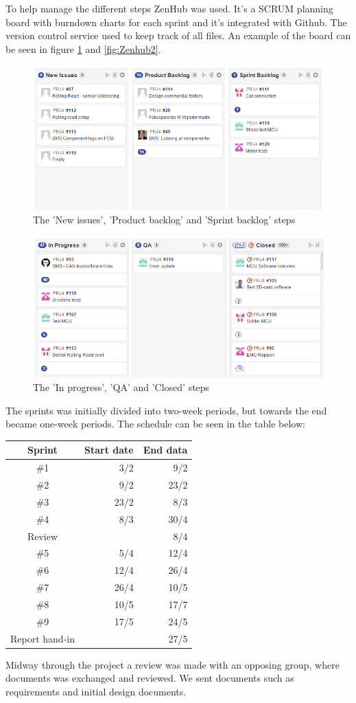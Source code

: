 To help manage the different steps ZenHub\cite{Zenhub} was used. It's a SCRUM planning board with burndown charts for each sprint and it's integrated with Github\cite{Github}. The version control service used to keep track of all files. An example of the board can be seen in figure \ref{fig:Zenhub1} and \vref{fig:Zenhub2}.

\begin{figure}
	\centering
	\includegraphics[width=0.7\linewidth]{SubPages/Images/Zenhub1}
	\caption{The 'New issues', 'Product backlog' and 'Sprint backlog' steps}
	\label{fig:Zenhub1}
\end{figure}

\begin{figure}
	\centering
	\includegraphics[width=0.7\linewidth]{SubPages/Images/Zenhub2}
	\caption{The 'In progress', 'QA' and 'Closed' steps}
	\label{fig:Zenhub2}
\end{figure}

The sprints was initially divided into two-week periods, but towards the end became one-week periods. The schedule can be seen in the table below:

\begin{tabular}{|c|r|r|}
	\hline \textbf{Sprint} & \textbf{Start date} & \textbf{End data} \\ 
	\hline \#1 & 3/2 & 9/2 \\ 
	\hline \#2 & 9/2 & 23/2 \\ 
	\hline \#3 & 23/2 & 8/3 \\ 
	\hline \#4 & 8/3 & 30/4 \\ 
	\hline Review & & 8/4 \\
	\hline \#5 & 5/4 & 12/4 \\ 
	\hline \#6 & 12/4 & 26/4 \\ 
	\hline \#7 & 26/4 & 10/5 \\ 
	\hline \#8 & 10/5 & 17/7 \\ 
	\hline \#9 & 17/5 & 24/5 \\ 
	\hline Report hand-in &  & 27/5 \\ 
	\hline 
\end{tabular} 

Midway through the project a review was made with an opposing group, where documents was exchanged and reviewed. We sent documents such as requirements and initial design documents.